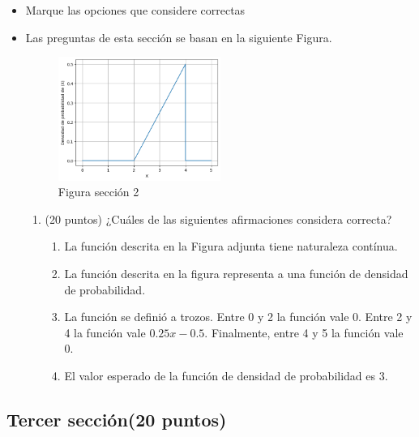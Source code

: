 \documentclass[12pt,a4paper]{article}
\providecommand{\tightlist}{%
  \setlength{\itemsep}{0pt}\setlength{\parskip}{0pt}}\usepackage{longtable,booktabs,array}
\providecommand{\tightlist}{%
  \setlength{\itemsep}{0pt}\setlength{\parskip}{2pt}}
\begin{document}
\begin{itemize}
\item
  Marque las opciones que considere correctas
\item
  Las preguntas de esta sección se basan en la siguiente Figura.

  \begin{figure}[H]

  {\centering \includegraphics[width=0.5\textwidth,height=\textheight]{./figures/output1.png}

  }

  \caption{Figura sección 2}

  \end{figure}%

  \begin{enumerate}
  \tightlist
  \item
    (20 puntos) ¿Cuáles de las siguientes afirmaciones considera
    correcta?

    \begin{enumerate}
    \tightlist
    \item
      La función descrita en la Figura adjunta tiene naturaleza
      contínua.
    \item
      La función descrita en la figura representa a una función de
      densidad de probabilidad.
    \item
      La función se definió a trozos. Entre 0 y 2 la función vale 0.
      Entre 2 y 4 la función vale \(0.25x - 0.5\). Finalmente, entre 4 y
      5 la función vale 0.
    \item
      El valor esperado de la función de densidad de probabilidad es 3.
    \end{enumerate}
  \end{enumerate}
\end{itemize}

\subsection{Tercer sección(20 puntos)}\label{tercer-secciuxf3n20-puntos}
\end{document}
